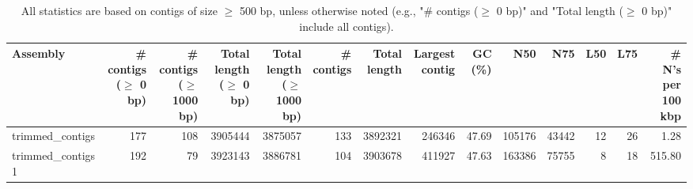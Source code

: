 \documentclass[12pt,a4paper]{article}
\begin{document}
\begin{table}[ht]
\begin{center}
\caption{All statistics are based on contigs of size $\geq$ 500 bp, unless otherwise noted (e.g., "\# contigs ($\geq$ 0 bp)" and "Total length ($\geq$ 0 bp)" include all contigs).}
\begin{tabular}{|l*{13}{|r}|}
\hline
Assembly & \# contigs ($\geq$ 0 bp) & \# contigs ($\geq$ 1000 bp) & Total length ($\geq$ 0 bp) & Total length ($\geq$ 1000 bp) & \# contigs & Total length & Largest contig & GC (\%) & N50 & N75 & L50 & L75 & \# N's per 100 kbp \\ \hline
trimmed\_contigs & 177 & 108 & 3905444 & 3875057 & 133 & 3892321 & 246346 & 47.69 & 105176 & 43442 & 12 & 26 & 1.28 \\ \hline
trimmed\_contigs 1 & 192 & 79 & 3923143 & 3886781 & 104 & 3903678 & 411927 & 47.63 & 163386 & 75755 & 8 & 18 & 515.80 \\ \hline
\end{tabular}
\end{center}
\end{table}
\end{document}

